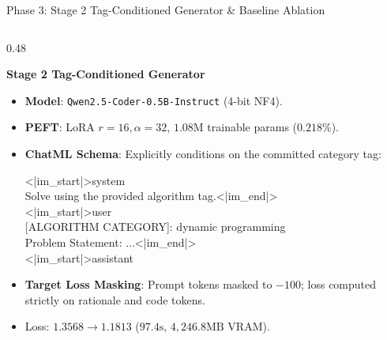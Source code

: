 \documentclass[aspectratio=169,10pt]{beamer}
\begin{document}
\begin{frame}{Phase 3: Stage 2 Tag-Conditioned Generator \& Baseline Ablation}
  \begin{columns}[T]
    \begin{column}{0.48\textwidth}
      \begin{block}{\textbf{Stage 2 Tag-Conditioned Generator}}
        \begin{itemize}\itemsep=1.5pt\scriptsize
          \item \textbf{Model}: \texttt{Qwen2.5-Coder-0.5B-Instruct} (4-bit NF4).
          \item \textbf{PEFT}: LoRA $r=16, \alpha=32$, $1.08\text{M}$ trainable params ($0.218\%$).
          \item \textbf{ChatML Schema}: Explicitly conditions on the committed category tag:
          \begin{center}
            \tiny\ttfamily
            <|im\_start|>system\\
            Solve using the provided algorithm tag.<|im\_end|>\\
            <|im\_start|>user\\
            {[ALGORITHM CATEGORY]}: dynamic programming\\
            Problem Statement: ...<|im\_end|>\\
            <|im\_start|>assistant
          \end{center}
          \item \textbf{Target Loss Masking}: Prompt tokens masked to $-100$; loss computed strictly on rationale and code tokens.
          \item Loss: $1.3568 \to 1.1813$ ($97.4\text{s}$, $4,246.8\text{MB}$ VRAM).
        \end{itemize}
      \end{block}
    \end{column}


\end{columns}
\end{frame}
\end{document}

